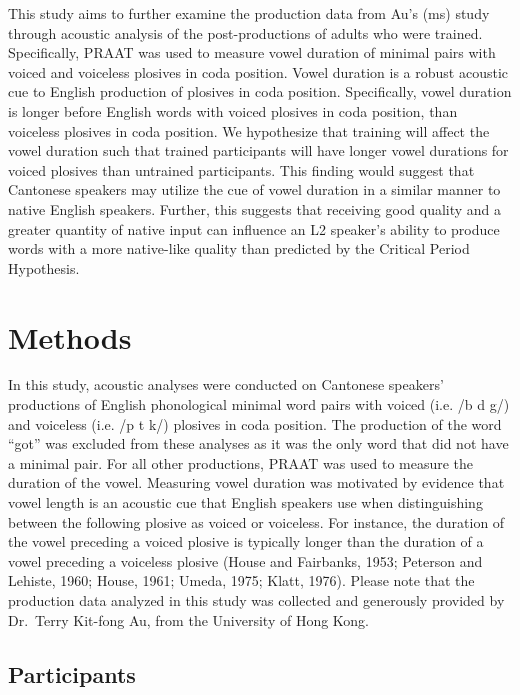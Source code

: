\documentclass[man]{apa6}
\theoremstyle{definition}
\theoremstyle{definition}
\theoremstyle{definition}
\theoremstyle{remark}
\begin{document}
This study aims to further examine the production data from Au's (ms)
study through acoustic analysis of the post-productions of adults who
were trained. Specifically, PRAAT was used to measure vowel duration of
minimal pairs with voiced and voiceless plosives in coda position. Vowel
duration is a robust acoustic cue to English production of plosives in
coda position. Specifically, vowel duration is longer before English
words with voiced plosives in coda position, than voiceless plosives in
coda position. We hypothesize that training will affect the vowel
duration such that trained participants will have longer vowel durations
for voiced plosives than untrained participants. This finding would
suggest that Cantonese speakers may utilize the cue of vowel duration in
a similar manner to native English speakers. Further, this suggests that
receiving good quality and a greater quantity of native input can
influence an L2 speaker's ability to produce words with a more
native-like quality than predicted by the Critical Period Hypothesis.

\section{Methods}\label{methods}

In this study, acoustic analyses were conducted on Cantonese speakers'
productions of English phonological minimal word pairs with voiced (i.e.
/b d g/) and voiceless (i.e. /p t k/) plosives in coda position. The
production of the word \enquote{got} was excluded from these analyses as
it was the only word that did not have a minimal pair. For all other
productions, PRAAT was used to measure the duration of the vowel.
Measuring vowel duration was motivated by evidence that vowel length is
an acoustic cue that English speakers use when distinguishing between
the following plosive as voiced or voiceless. For instance, the duration
of the vowel preceding a voiced plosive is typically longer than the
duration of a vowel preceding a voiceless plosive (House and Fairbanks,
1953; Peterson and Lehiste, 1960; House, 1961; Umeda, 1975; Klatt,
1976). Please note that the production data analyzed in this study was
collected and generously provided by Dr.~Terry Kit-fong Au, from the
University of Hong Kong.

\subsection{Participants}\label{participants}
\end{document}
